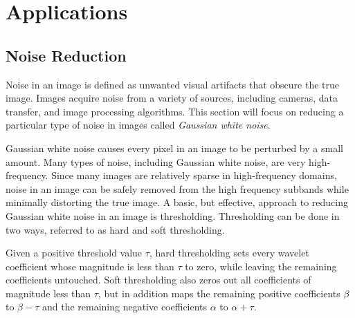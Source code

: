 \section*{Applications}

\subsection*{Noise Reduction}
Noise in an image is defined as unwanted visual artifacts that obscure the true image.
Images acquire noise from a variety of sources, including cameras, data transfer, and image processing algorithms.
This section will focus on reducing a particular type of noise in images called \emph{Gaussian white noise}.


Gaussian white noise causes every pixel in an image to be perturbed by a small amount. %
Many types of noise, including Gaussian white noise, are very high-frequency.
Since many images are relatively sparse in high-frequency domains, noise in an image can be safely removed from the high frequency subbands while minimally distorting the true image.
A basic, but effective, approach to reducing Gaussian white noise in an image is thresholding.
Thresholding can be done in two ways, referred to as hard and soft thresholding.

Given a positive threshold value $\tau$, hard thresholding sets every wavelet coefficient whose magnitude is less than $\tau$ to zero, while leaving the remaining coefficients untouched.
Soft thresholding also zeros out all coefficients of magnitude less than $\tau$, but in addition maps the remaining positive coefficients $\beta$ to $\beta - \tau$ and the remaining negative coefficients
$\alpha$ to $\alpha + \tau$.

\begin{comment}
Implementing these simple thresholding algorithms in Python is straight-forward, but PyWavelets already provides this functionality.
The following code gives an example.

\begin{lstlisting}
>>> A = np.arange(-4,5).reshape(3,3)
>>> A
array([[-4, -3, -2],
       [-1,  0,  1],
       [ 2,  3,  4]])
>>> pywt.thresholding.hard(A,1.5)
array([[-4, -3, -2],
       [ 0,  0,  0],
       [ 2,  3,  4]])
>>> pywt.thresholding.soft(A,1.5)
array([[-2.5, -1.5, -0.5],
       [ 0. ,  0. ,  0. ],
       [ 0.5,  1.5,  2.5]])
\end{lstlisting}
\end{comment}


